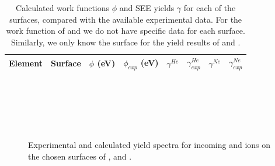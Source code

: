 \begin{refsection}
\begin{table}[ht] 
\centering 
\renewcommand{\arraystretch}{1.3} 
\caption{Calculated work functions $\phi$ and SEE yields $\gamma$ for each of 
the surfaces, compared with the available experimental data. For the work 
function of  and  we do not have specific data for each surface. 
Similarly, we only know the surface for the yield results of  and 
.} 
\label{quotas:tab-metal_results} 
\begin{tabular}{c @{\hskip 1em} | @{\hskip 1em} c @{\hskip 1em} | @{\hskip 
1em}  c @{\hskip 1em} c @{\hskip 1em} | @{\hskip 1em}  c @{\hskip 2em}  c 
@{\hskip 1em} | @{\hskip 1em} c @{\hskip 2em} c} 
 Element & Surface & $\phi$ (\si{\electronvolt}) & $\phi_{exp}$ 
(\si{\electronvolt}) & $\gamma^{He}$ & $\gamma^{He}_{exp}$ & $\gamma^{Ne}$ & 
$\gamma^{Ne}_{exp}$ \\\hline 
 
\hline 
\end{tabular} 
\end{table} \clearpage
 
\begin{figure}[!ht]
    \centering 
    \captionsetup{width=0.9\textwidth}
    \begin{subfigure}[t]{0.49\textwidth} 
        \centering 
         
    \end{subfigure}%
    ~  
    \begin{subfigure}[t]{0.49\textwidth} 
        \centering 
         
    \end{subfigure} 
    \begin{subfigure}[t]{0.49\textwidth} 
        \centering 
         
    \end{subfigure}%
    ~  
    \begin{subfigure}[t]{0.49\textwidth} 
        \centering 
         
    \end{subfigure} 
    \begin{subfigure}[t]{0.49\textwidth} 
        \centering 
         
    \end{subfigure}%
    ~  
    \begin{subfigure}[t]{0.49\textwidth} 
        \centering 
         
    \end{subfigure} 
    \caption{\label{quotas:fig-metals_results1} Experimental and calculated 
yield spectra for incoming  and  ions on the chosen surfaces of ,  and .} 
\end{figure} \clearpage 


\end{refsection}
